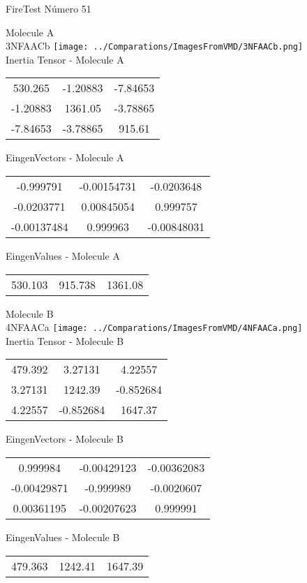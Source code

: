 \vtab[-2cm]
\begin{center}
{\large FireTest \tab Número 51}
\end{center}
\begin{multicols}{2}
\begin{center}

Molecule A \\ 
3NFAACb
\texttt{[image: ../Comparations/ImagesFromVMD/3NFAACb.png]}
\\
Inertia Tensor - Molecule A \\
\vtab

\begin{tabular}{|c c c|}
530.265	 & 	-1.20883	 & 	-7.84653	 \\
-1.20883	 & 	1361.05	 & 	-3.78865	 \\
-7.84653	 & 	-3.78865	 & 	915.61
\end{tabular}

\vtab
 EingenVectors - Molecule A     \\
\vtab
\begin{tabular}{|c c c|}
-0.999791	 & 	-0.00154731	 & 	-0.0203648	 \\
-0.0203771	 & 	0.00845054	 & 	0.999757	 \\
-0.00137484	 & 	0.999963	 & 	-0.00848031
\end{tabular}

\vtab
 EingenValues - Molecule A     \\
\vtab
\begin{tabular}{|c c c|}
530.103	 & 	915.738	 & 	1361.08	 \\
\end{tabular}
\columnbreak

Molecule B \\ 
4NFAACa
\texttt{[image: ../Comparations/ImagesFromVMD/4NFAACa.png]}
\\
Inertia Tensor - Molecule B \\
\vtab

\begin{tabular}{|c c c|}
479.392	 & 	3.27131	 & 	4.22557	 \\
3.27131	 & 	1242.39	 & 	-0.852684	 \\
4.22557	 & 	-0.852684	 & 	1647.37
\end{tabular}

\vtab
 EingenVectors - Molecule B     \\
\vtab
\begin{tabular}{|c c c|}
0.999984	 & 	-0.00429123	 & 	-0.00362083	 \\
-0.00429871	 & 	-0.999989	 & 	-0.0020607	 \\
0.00361195	 & 	-0.00207623	 & 	0.999991
\end{tabular}

\vtab
 EingenValues - Molecule B     \\
\vtab
\begin{tabular}{|c c c|}
479.363	 & 	1242.41	 & 	1647.39	 \\
\end{tabular}

\end{center}
\end{multicols}
